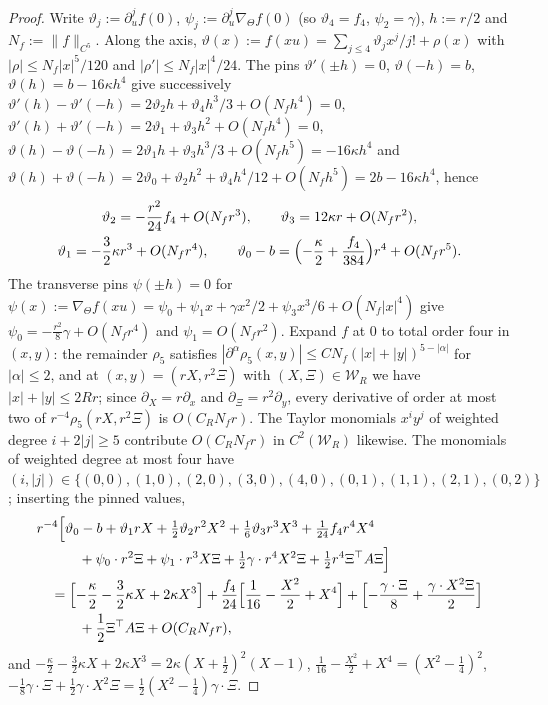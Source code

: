\begin{proof}
Write $\vartheta_j:=\partial_u^jf(0)$, $\psi_j:=\partial_u^j\nabla_\Theta f(0)$ (so $\vartheta_4=f_4$, $\psi_2=\gamma$), $h:=r/2$ and $N_f:=\|f\|_{C^5}$. Along the axis, $\vartheta(x):=f(xu)=\sum_{j\le4}\vartheta_jx^j/j!+\rho(x)$ with $|\rho|\le N_f|x|^5/120$ and $|\rho'|\le N_f|x|^4/24$. The pins $\vartheta'(\pm h)=0$, $\vartheta(-h)=b$, $\vartheta(h)=b-16\kappa h^4$ give successively $\vartheta'(h)-\vartheta'(-h)=2\vartheta_2h+\vartheta_4h^3/3+O(N_fh^4)=0$, $\vartheta'(h)+\vartheta'(-h)=2\vartheta_1+\vartheta_3h^2+O(N_fh^4)=0$, $\vartheta(h)-\vartheta(-h)=2\vartheta_1h+\vartheta_3h^3/3+O(N_fh^5)=-16\kappa h^4$ and $\vartheta(h)+\vartheta(-h)=2\vartheta_0+\vartheta_2h^2+\vartheta_4h^4/12+O(N_fh^5)=2b-16\kappa h^4$, hence
\begin{equation}\label{eq:cusp-axial}
\begin{gathered}
\vartheta_2=-\frac{r^2}{24}f_4+O(N_fr^3),\qquad \vartheta_3=12\kappa r+O(N_fr^2),\\
\vartheta_1=-\frac32\kappa r^3+O(N_fr^4),\qquad \vartheta_0-b=\Bigl(-\frac\kappa2+\frac{f_4}{384}\Bigr)r^4+O(N_fr^5).
\end{gathered}
\end{equation}
The transverse pins $\psi(\pm h)=0$ for $\psi(x):=\nabla_\Theta f(xu)=\psi_0+\psi_1x+\gamma x^2/2+\psi_3x^3/6+O(N_f|x|^4)$ give $\psi_0=-\frac{r^2}8\gamma+O(N_fr^4)$ and $\psi_1=O(N_fr^2)$. Expand $f$ at $0$ to total order four in $(x,y)$: the remainder $\rho_5$ satisfies $|\partial^\alpha\rho_5(x,y)|\le CN_f(|x|+|y|)^{5-|\alpha|}$ for $|\alpha|\le2$, and at $(x,y)=(rX,r^2\Xi)$ with $(X,\Xi)\in\mathcal W_R$ we have $|x|+|y|\le2Rr$; since $\partial_X=r\partial_x$ and $\partial_\Xi=r^2\partial_y$, every derivative of order at most two of $r^{-4}\rho_5(rX,r^2\Xi)$ is $O(C_RN_fr)$. The Taylor monomials $x^iy^j$ of weighted degree $i+2|j|\ge5$ contribute $O(C_RN_fr)$ in $C^2(\mathcal W_R)$ likewise. The monomials of weighted degree at most four have $(i,|j|)\in\{(0,0),(1,0),(2,0),(3,0),(4,0),(0,1),(1,1),(2,1),(0,2)\}$; inserting the pinned values,
\[
\begin{aligned}
&r^{-4}\Bigl[\vartheta_0-b+\vartheta_1rX+\tfrac12\vartheta_2r^2X^2+\tfrac16\vartheta_3r^3X^3+\tfrac1{24}f_4r^4X^4\\
&\qquad\quad+\psi_0\cdot r^2\Xi+\psi_1\cdot r^3X\Xi+\tfrac12\gamma\cdot r^4X^2\Xi+\tfrac12r^4\Xi^{\top}A\Xi\Bigr]\\
&\quad=\Bigl[-\frac\kappa2-\frac32\kappa X+2\kappa X^3\Bigr]+\frac{f_4}{24}\Bigl[\frac1{16}-\frac{X^2}2+X^4\Bigr]+\Bigl[-\frac{\gamma\cdot\Xi}8+\frac{\gamma\cdot X^2\Xi}2\Bigr]\\
&\qquad\quad+\frac12\Xi^{\top}A\Xi+O(C_RN_fr),
\end{aligned}
\]
and $-\frac\kappa2-\frac32\kappa X+2\kappa X^3=2\kappa(X+\frac12)^2(X-1)$, $\frac1{16}-\frac{X^2}2+X^4=(X^2-\frac14)^2$, $-\frac18\gamma\cdot\Xi+\frac12\gamma\cdot X^2\Xi=\frac12(X^2-\frac14)\gamma\cdot\Xi$.
\end{proof}

